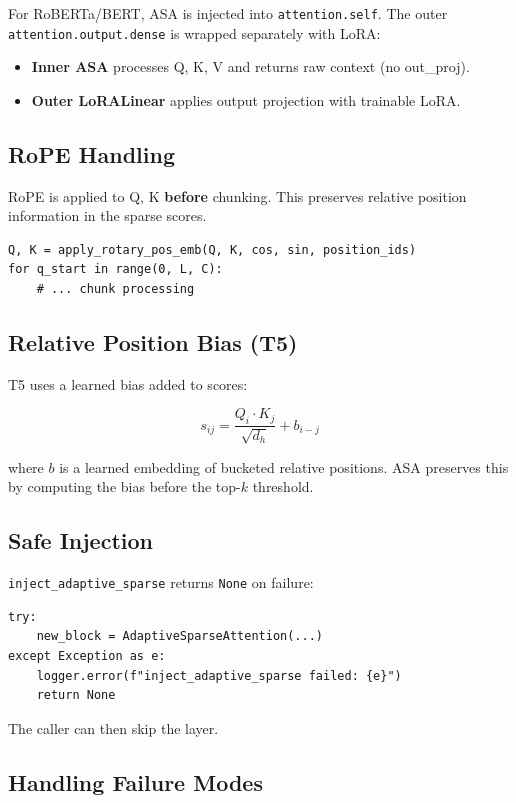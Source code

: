 For RoBERTa/BERT, ASA is injected into \texttt{attention.self}. The outer 
\texttt{attention.output.dense} is wrapped separately with LoRA:

\begin{itemize}
\item \textbf{Inner ASA} processes Q, K, V and returns raw context (no out\_proj).
\item \textbf{Outer LoRALinear} applies output projection with trainable LoRA.

\end{itemize}
\subsection{RoPE Handling}

RoPE is applied to Q, K \textbf{before} chunking. This preserves relative 
position information in the sparse scores.

\begin{lstlisting}
Q, K = apply_rotary_pos_emb(Q, K, cos, sin, position_ids)
for q_start in range(0, L, C):
    # ... chunk processing
\end{lstlisting}

\subsection{Relative Position Bias (T5)}

T5 uses a learned bias added to scores:

\[
s_{ij} = \frac{Q_i \cdot K_j}{\sqrt{d_h}} + b_{i-j}
\]

where $b$ is a learned embedding of bucketed relative positions. ASA preserves 
this by computing the bias before the top-$k$ threshold.

\subsection{Safe Injection}

\texttt{inject\_adaptive\_sparse} returns \texttt{None} on failure:

\begin{lstlisting}
try:
    new_block = AdaptiveSparseAttention(...)
except Exception as e:
    logger.error(f"inject_adaptive_sparse failed: {e}")
    return None
\end{lstlisting}

The caller can then skip the layer.

\subsection{Handling Failure Modes}

